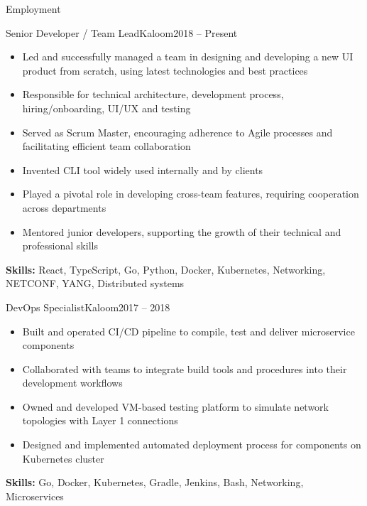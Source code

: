 \documentclass[]{cv}
\begin{document}
	\makeheader

	\begin{cvsection}{Employment}
		\begin{cvsubsection}{Senior Developer / Team Lead}{Kaloom}{2018 -- Present}
			\begin{itemize}
				\item Led and successfully managed a team in designing and developing a new UI product from scratch, using latest technologies and best practices
				\item Responsible for technical architecture, development process, hiring/onboarding, UI/UX and testing
				\item Served as Scrum Master, encouraging adherence to Agile processes and facilitating efficient team collaboration
				\item Invented CLI tool widely used internally and by clients
				\item Played a pivotal role in developing cross-team features, requiring cooperation across departments
				\item Mentored junior developers, supporting the growth of their technical and professional skills
			\end{itemize}
			\small{\textbf{Skills:} React, TypeScript, Go, Python, Docker, Kubernetes, Networking, NETCONF, YANG, Distributed systems}
		\end{cvsubsection}

		\begin{cvsubsection}{DevOps Specialist}{Kaloom}{2017 -- 2018}
			\begin{itemize}
				\item Built and operated CI/CD pipeline to compile, test and deliver microservice components
				\item Collaborated with teams to integrate build tools and procedures into their development workflows
				\item Owned and developed VM-based testing platform to simulate network topologies with Layer 1 connections
				\item Designed and implemented automated deployment process for components on Kubernetes cluster
			\end{itemize}
			\small{\textbf{Skills:} Go, Docker, Kubernetes, Gradle, Jenkins, Bash, Networking, Microservices}
		\end{cvsubsection}


\end{cvsection}
\end{document}
